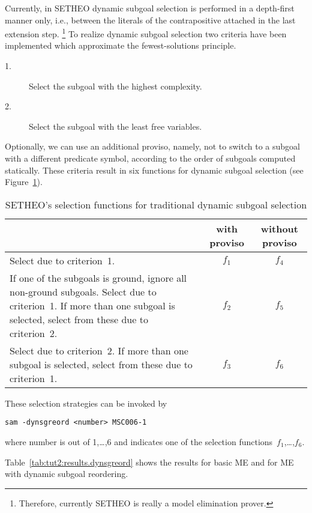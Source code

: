 Currently, in SE\-THEO dynamic subgoal selection is performed in a 
depth-first manner only, i.e., between the literals of the 
contrapositive attached in the last extension step.%
\footnote{Therefore, currently SETHEO is really a model elimination
	prover.} 
To realize dynamic subgoal selection two criteria have been
implemented which approximate the fewest-solutions principle.  
\begin{description}
\item [{\rm 1.} ]
      Select the subgoal with the highest complexity. 
\item [{\rm 2.} ]
      Select the subgoal with the least free variables. 
\end{description}
Optionally, we can use an additional proviso, namely, not to switch to
a subgoal with a different predicate symbol, according to the order of
subgoals computed statically. 
These criteria result in six functions for dynamic subgoal selection
(see Figure~\ref{fig:sg-selection-functions}).

\begin{table}
\begin{tabular}{|p{8.7cm}||c|c|}
\hline
& with proviso & without proviso  \\  \hline \hline 
Select due to criterion~1. 
& $f_1$ & $f_4$  \\  \hline
If one of the subgoals is ground, ignore all non-ground subgoals. 
Select due to criterion~1. 
If more than one subgoal is selected, select from these due to
criterion~2.  
& $f_2$ & $f_5$  \\  \hline
Select due to criterion~2. If more than one subgoal is selected, select from these due to criterion~1.
& $f_3$ & $f_6$  \\  \hline
\end{tabular}
\caption{SETHEO's selection functions for traditional dynamic subgoal
         selection} 
\label{fig:sg-selection-functions}
\end{table}

These selection strategies can be invoked by 
\begin{center}
\begin{verbatim}
sam -dynsgreord <number> MSC006-1
\end{verbatim}
\end{center}
where number is out of 1,\dots,6 and indicates one of the
selection functions~$f_1$,\dots,$f_6$.

Table~\ref{tab:tut2:results.dynsgreord} shows the results for basic
ME and for ME with dynamic subgoal reordering.

